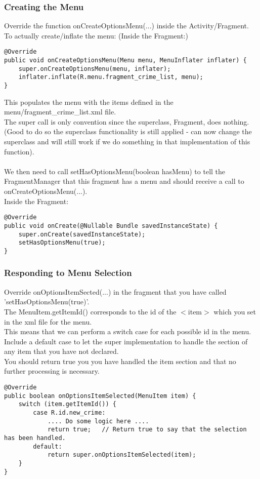 \documentclass[]{article}
\begin{document}
\subsubsection{Creating the Menu}
Override the function onCreateOptionsMenu(...) inside the Activity/Fragment.
\\
To actually create/inflate the menu:  (Inside the Fragment:)
\begin{lstlisting}
@Override
public void onCreateOptionsMenu(Menu menu, MenuInflater inflater) {
	super.onCreateOptionsMenu(menu, inflater);
	inflater.inflate(R.menu.fragment_crime_list, menu);
}
\end{lstlisting}
This populates the menu with the items defined in the menu/fragment\_crime\_list.xml file.
\\
The super call is only convention since the superclass, Fragment, does nothing.  (Good to do so the superclass functionality is still applied - can now change the superclass and will still work if we do something in that implementation of this function).
\\\\
We then need to call setHasOptionsMenu(boolean hasMenu) to tell the FragmentManager that this fragment has a menu and should receive a call to onCreateOptionsMenu(...).
\\
Inside the Fragment:
\begin{lstlisting}
@Override
public void onCreate(@Nullable Bundle savedInstanceState) {
	super.onCreate(savedInstanceState);
	setHasOptionsMenu(true);
}
\end{lstlisting}

\subsubsection{Responding to Menu Selection}
Override onOptionsItemSected(...) in the fragment that you have called 'setHasOptionsMenu(true)'.
\\
The MenuItem.getItemId() corresponds to the id of the $<$item$>$ which you set in the xml file for the menu.
\\
This means that we can perform a switch case for each possible id in the menu.
\\
Include a default case to let the super implementation to handle the section of any item that you have not declared.
\\
You should return true you you have handled the item section and that no further processing is necessary.
\begin{lstlisting}
@Override
public boolean onOptionsItemSelected(MenuItem item) {
	switch (item.getItemId()) {
		case R.id.new_crime:
			.... Do some logic here ....
			return true;   // Return true to say that the selection has been handled.
		default:
			return super.onOptionsItemSelected(item);
	}
}
\end{lstlisting}
\end{document}
